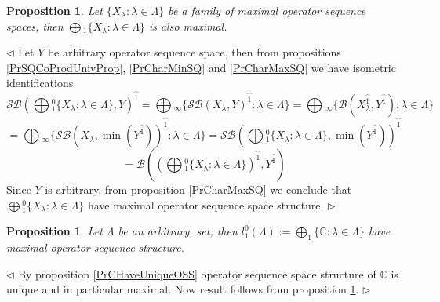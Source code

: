 \documentclass[12pt]{article}
\newtheorem{proposition}[theorem]{Proposition}
\newenvironment{proof}{\par $\triangleleft$}{$\triangleright$}
\begin{document}
\begin{proposition}\label{PrMaxCommuteWithCoprod} Let $\{X_\lambda:\lambda\in\Lambda\}$ be a family of maximal operator sequence spaces, then $\bigoplus{}_1\{X_\lambda:\lambda\in\Lambda\}$ is also maximal.
\end{proposition} 
\begin{proof}
Let $Y$ be arbitrary operator sequence space, then from propositions \ref{PrSQCoProdUnivProp}, \ref{PrCharMinSQ} and \ref{PrCharMaxSQ} we have isometric identifications
$$
\mathcal{SB}\left(\bigoplus{}_1^0\{X_\lambda:\lambda\in\Lambda\},Y\right)^{\wideparen{1}}
=\bigoplus{}_\infty\{\mathcal{SB}(X_\lambda,Y)^{\wideparen{1}}:\lambda\in\Lambda\}
=\bigoplus{}_\infty\{\mathcal{B}(X_\lambda^{\wideparen{1}},Y^{\wideparen{1}}):\lambda\in\Lambda\}
$$
$$
=\bigoplus{}_\infty\{\mathcal{SB}(X_\lambda,\min(Y^{\wideparen{1}}))^{\wideparen{1}}:\lambda\in\Lambda\}
=\mathcal{SB}\left(\bigoplus{}_1^0\{X_\lambda:\lambda\in\Lambda\},\min(Y^{\wideparen{1}})\right)^{\wideparen{1}}
$$
$$
=\mathcal{B}\left(\left(\bigoplus{}_1^0\{X_\lambda:\lambda\in\Lambda\}\right)^{\wideparen{1}},Y^{\wideparen{1}}\right)
$$
Since $Y$ is arbitrary, from proposition \ref{PrCharMaxSQ} we conclude that $\bigoplus{}_1^0\{X_\lambda:\lambda\in\Lambda\}$ have maximal operator sequence space structure.
\end{proof}

\begin{proposition}\label{Prl1IsMax} Let $\Lambda$ be an arbitrary, set, then $l_1^0(\Lambda):=\bigoplus_1\{\mathbb{C}:\lambda\in\Lambda\}$ have maximal operator sequence structure.
\end{proposition}
\begin{proof} By proposition \ref{PrCHaveUniqueOSS} operator sequence space structure of $\mathbb{C}$ is unique and in particular maximal. Now result follows from proposition \ref{PrMaxCommuteWithCoprod}.
\end{proof}
\end{document}
